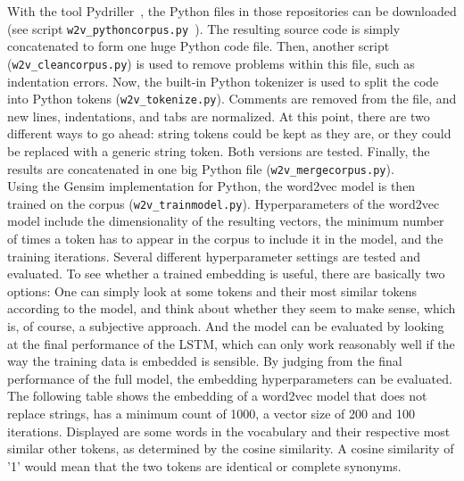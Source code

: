 \documentclass[
a4paper,
pagesize,
pdftex,
12pt,
twoside, %
BCOR=5mm, %
ngerman,
fleqn,
final,
]{scrartcl}
\begin{document}
	\normalsize
	With the tool Pydriller~\cite{Spadini.2018}, the Python files in those repositories can be downloaded (see script \texttt{w2v\_pythoncorpus.py }). The resulting source code is simply concatenated to form one huge Python code file. Then, another script (\texttt{w2v\_cleancorpus.py}) is used to remove problems within this file, such as indentation errors. Now, the built-in Python tokenizer is used to split the code into Python tokens (\texttt{w2v\_tokenize.py}). Comments are removed from the file, and new lines, indentations, and tabs are normalized. At this point, there are two different ways to go ahead: string tokens could be kept as they are, or they could be replaced with a generic string token. Both versions are tested. Finally, the results are concatenated in one big Python file (\texttt{w2v\_mergecorpus.py}).\\
	Using the Gensim implementation for Python, the word2vec model is then trained on the corpus (\texttt{w2v\_trainmodel.py}). Hyperparameters of the word2vec model include the dimensionality of the resulting vectors, the minimum number of times a token has to appear in the corpus to include it in the model, and the training iterations. Several different hyperparameter settings are tested and evaluated. To see whether a trained embedding is useful, there are basically two options: One can simply look at some tokens and their most similar tokens according to the model, and think about whether they seem to make sense, which is, of course, a subjective approach. And the model can be evaluated by looking at the final performance of the LSTM, which can only work reasonably well if the way the training data is embedded is sensible. By judging from the final performance of the full model, the embedding hyperparameters can be evaluated.\\
	The following table shows the embedding of a word2vec model that does not replace strings, has a minimum count of 1000, a vector size of 200 and 100 iterations. Displayed are some words in the vocabulary and their respective most similar other tokens, as determined by the cosine similarity. A cosine similarity of '1' would mean that the two tokens are identical or complete synonyms.
	
\end{document}
